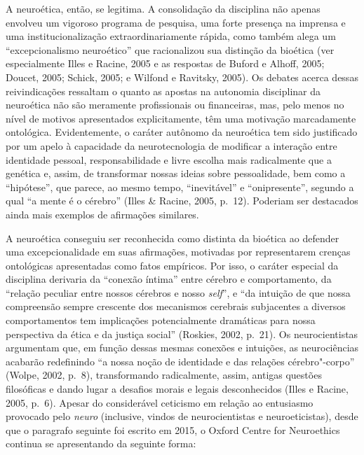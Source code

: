 A neuroética, então, se legitima. A consolidação da disciplina não
apenas envolveu um vigoroso programa de pesquisa, uma forte presença na
imprensa e uma institucionalização extraordinariamente rápida, como
também alega um ``excepcionalismo neuroético'' que racionalizou sua
distinção da bioética (ver especialmente Illes e Racine, 2005 e as
respostas de Buford e Alhoff, 2005; Doucet, 2005; Schick, 2005; e
Wilfond e Ravitsky, 2005). Os debates acerca dessas reivindicações
ressaltam o quanto as apostas na autonomia disciplinar da neuroética não
são meramente profissionais ou financeiras, mas, pelo menos no nível de
motivos apresentados explicitamente, têm uma motivação marcadamente
ontológica. Evidentemente, o caráter autônomo da neuroética tem sido
justificado por um apelo à capacidade da neurotecnologia de modificar a
interação entre identidade pessoal, responsabilidade e livre escolha
mais radicalmente que a genética e, assim, de transformar nossas ideias
sobre pessoalidade, bem como a ``hipótese'', que parece, ao mesmo tempo,
``inevitável'' e ``onipresente'', segundo a qual ``a mente é o cérebro''
(Illes \& Racine, 2005, p.~12). Poderiam ser destacados ainda mais
exemplos de afirmações similares.

A neuroética conseguiu ser reconhecida como distinta da bioética ao
defender uma excepcionalidade em suas afirmações, motivadas por
representarem crenças ontológicas apresentadas como fatos empíricos. Por
isso, o caráter especial da disciplina derivaria da ``conexão íntima''
entre cérebro e comportamento, da ``relação peculiar entre nossos
cérebros e nosso \emph{self}'', e ``da intuição de que nossa compreensão sempre
crescente dos mecanismos cerebrais subjacentes a diversos comportamentos
tem implicações potencialmente dramáticas para nossa perspectiva da
ética e da justiça social'' (Roskies, 2002, p.~21). Os neurocientistas
argumentam que, em função dessas mesmas conexões e intuições, as
neurociências acabarão redefinindo ``a nossa noção de identidade e das
relações cérebro"-corpo'' (Wolpe, 2002, p.~8), transformando radicalmente,
assim, antigas questões filosóficas e dando lugar a desafios morais e
legais desconhecidos (Illes e Racine, 2005, p.~6). Apesar do considerável
ceticismo em relação ao entusiasmo provocado pelo \emph{neuro}
(inclusive, vindos de neurocientistas e neuroeticistas), desde que o
paragrafo seguinte foi escrito em 2015, o Oxford Centre for Neuroethics
continua se apresentando da seguinte forma:

